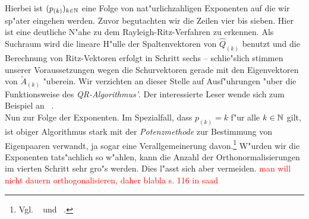 Hierbei ist $(p_{(k)})_{k\in\mathbb{N}}$ eine Folge von nat"urlichzahligen Exponenten auf die wir sp"ater eingehen werden. Zuvor
begutachten wir die Zeilen vier bis sieben. Hier ist eine deutliche N"ahe zu dem Rayleigh-Ritz-Verfahren zu erkennen.
Als Suchraum wird die lineare H"ulle der Spaltenvektoren von $\hat{Q}_{(k)}$ benutzt und die Berechnung von Ritz-Vektoren erfolgt in Schritt sechs -- schlie"slich stimmen unserer Voraussetzungen wegen die Schurvektoren gerade mit den Eigenvektoren von $\widetilde{A}_{(k)}$ "uberein.
Wir verzichten an dieser Stelle auf Ausf"uhrungen "uber die Funktionsweise des \emph{QR-Algorithmus'}. Der interessierte Leser wende sich zum Beispiel an ~\cite[55 ff.]{stewart}.\\

Nun zur Folge der Exponenten. Im Spezialfall, dass $p_{(k)} = k$ f"ur alle $k\in\mathbb{N}$ gilt, ist obiger Algorithmus stark mit der \emph{Potenzmethode} zur Bestimmung von Eigenpaaren verwandt, ja sogar eine Verallgemeinerung davon.\footnote{Vgl. ~\cite[115 ff.]{saad} und ~\cite[1 f.]{kpt}.}
W"urden wir die Exponenten tats"achlich so w"ahlen, kann die Anzahl der Orthonormalisierungen im vierten Schritt sehr gro"s werden.
Dies l"asst sich aber vermeiden.
\textcolor{red}{man will nicht dauern orthogonalisieren, daher blabla s. 116 in saad}





